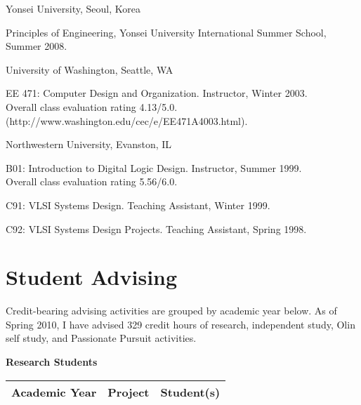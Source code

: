 \documentclass[line]{res}
\newenvironment{list1}{
  \begin{list}{\ding{113}}{%
      \setlength{\itemsep}{0in}
      \setlength{\parsep}{0in} \setlength{\parskip}{0in}
      \setlength{\topsep}{0in} \setlength{\partopsep}{0in} 
      \setlength{\leftmargin}{0.17in}}}{\end{list}}
\begin{document}
\begin{resume}
\begin{enumerate}
		\item Yonsei University, Seoul, Korea\\
		\vspace{-.1in} 
		\begin{list1}
			\item[] Principles of Engineering, Yonsei University International Summer School, Summer 2008. 
		\end{list1}
		
		\item University of Washington, Seattle, WA\\
		\vspace{-.1in} 
		\begin{list1}
			\item[] EE 471: Computer Design and Organization. Instructor, Winter 2003.\\
			Overall class evaluation rating 4.13/5.0.\\
			(http://www.washington.edu/cec/e/EE471A4003.html). 
		\end{list1}
		
		\item Northwestern University, Evanston, IL\\
		\vspace{-.1in} 
		\begin{list1}
			\item[] B01: Introduction to Digital Logic Design. Instructor, Summer 1999.\\
			Overall class evaluation rating 5.56/6.0. 
			\item[] C91: VLSI Systems Design. Teaching Assistant, Winter 1999. 
			\item[] C92: VLSI Systems Design Projects. Teaching Assistant, Spring 1998. 
		\end{list1}
	\end{enumerate}
	
	\section{\sc Student Advising}
	
	Credit-bearing advising activities are grouped by academic year below. As of Spring 2010, I have advised 329 credit hours of research, independent study, Olin self study, and Passionate Pursuit activities.
	
	\textbf{Research Students}
	\begin{longtable}
		{ | l | l | l |} \hline \textbf{Academic Year} & \textbf{Project} & \textbf{Student(s)} \\
		\hline
		

\end{longtable}
\end{resume}
\end{document}
